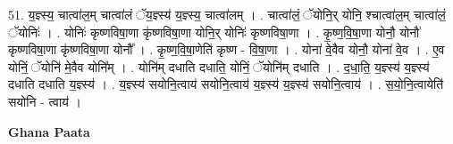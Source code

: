 \documentclass[17pt]{extarticle}
\begin{document}
51. य॒ज्ञ्स्य॒ चात्वा॑ल॒म् चात्वा॑लं ॅय॒ज्ञ्स्य॑ य॒ज्ञ्स्य॒ चात्वा॑लम् । . चात्वा॑लं॒ ॅयोनि॒र् योनि॒ श्चात्वा॑ल॒म् चात्वा॑लं॒ ॅयोनिः॑ । . योनिः॑ कृष्णविषा॒णा कृ॑ष्णविषा॒णा योनि॒र् योनिः॑ कृष्णविषा॒णा । . कृ॒ष्ण॒वि॒षा॒णा योनौ॒ योनौ॑ कृष्णविषा॒णा कृ॑ष्णविषा॒णा योनौ᳚ । . कृ॒ष्ण॒वि॒षा॒णेति॑ कृष्ण - वि॒षा॒णा । . योना॑ वे॒वैव योनौ॒ योना॑ वे॒व । . ए॒व योनिं॒ ॅयोनि॑ मे॒वैव योनि᳚म् । . योनि॑म् दधाति दधाति॒ योनिं॒ ॅयोनि॑म् दधाति । . द॒धा॒ति॒ य॒ज्ञ्स्य॑ य॒ज्ञ्स्य॑ दधाति दधाति य॒ज्ञ्स्य॑ । . य॒ज्ञ्स्य॑ सयोनि॒त्वाय॑ सयोनि॒त्वाय॑ य॒ज्ञ्स्य॑ य॒ज्ञ्स्य॑ सयोनि॒त्वाय॑ । . स॒यो॒नि॒त्वायेति॑ सयोनि - त्वाय॑ । \newline

\textbf{Ghana Paata } \newline
\end{document}
